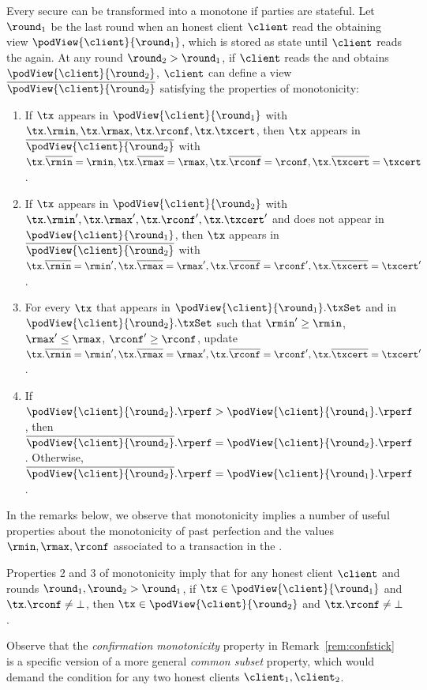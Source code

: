 \begin{remark}
	Every secure \podtm can be transformed into a monotone \podtm if parties are stateful. Let $\round_1$ be the last round when an honest client $\client$ read the \podtm obtaining view $\podView{\client}{\round_1}$, which is stored as state until $\client$ reads the \podtm again. At any round $\round_2>\round_1$, if $\client$ reads the \podtm and obtains $\podView{\client}{\round_2}$, $\client$ can define a view $\overline{\podView{\client}{\round_2}}$ satisfying the properties of \podtm monotonicity:

	\begin{enumerate}
		\item If $\tx$ appears in $\podView{\client}{\round_1}$ with $\tx.\rmin,\tx.\rmax,\tx.\rconf,\tx.\txcert$, then $\tx$ appears in $\overline{\podView{\client}{\round_2}}$ with $\tx.\overline{\rmin}=\rmin,\tx.\overline{\rmax}=\rmax,\tx.\overline{\rconf}=\rconf,\tx.\overline{\txcert}=\txcert$.
		\item If $\tx$ appears in $\podView{\client}{\round_2}$ with $\tx.\rmin',\tx.\rmax',\tx.\rconf',\tx.\txcert'$ and does not appear in $\podView{\client}{\round_1}$, then $\tx$ appears in $\overline{\podView{\client}{\round_2}}$ with $\tx.\overline{\rmin}=\rmin',\tx.\overline{\rmax}=\rmax',\tx.\overline{\rconf}=\rconf',\tx.\overline{\txcert}=\txcert'$.
		\item For every $\tx$ that appears in $\podView{\client}{\round_1}.\txSet$ and in  $\podView{\client}{\round_2}.\txSet$ such that $\rmin'\geq \rmin$, $\rmax' \leq \rmax$, $\rconf' \geq \rconf$, update $\tx.\overline{\rmin}=\rmin',\tx.\overline{\rmax}=\rmax',\tx.\overline{\rconf}=\rconf',\tx.\overline{\txcert}=\txcert'$.
		\item If  $\podView{\client}{\round_2}.\rperf > \podView{\client}{\round_1}.\rperf$, then $\overline{\podView{\client}{\round_2}}.\rperf=\podView{\client}{\round_2}.\rperf $. Otherwise, $\overline{\podView{\client}{\round_2}}.\rperf=\podView{\client}{\round_1}.\rperf $.

	\end{enumerate}
\end{remark}

In the remarks below, we observe that \podtm monotonicity implies a number of useful properties about the monotonicity of past perfection and the values $\rmin,\rmax,\rconf$ associated to a transaction in the \podtm.

\begin{remark}\label{rem:confstick}
	Properties 2 and 3 of \podtm monotonicity imply that  for any honest client $\client$ and rounds $\round_1, \round_2 > \round_1$,
	if $\tx \in \podView{\client}{\round_1}$ and $\tx.\rconf \neq \bot$, then $\tx \in \podView{\client}{\round_2}$ and $\tx.\rconf \neq \bot$.
\end{remark}

\begin{remark}
	Observe that the \emph{confirmation monotonicity} property in Remark~\ref{rem:confstick} is a specific version of a more general \emph{common subset} property, which would demand the condition for any two honest clients $\client_1, \client_2$.
\end{remark}